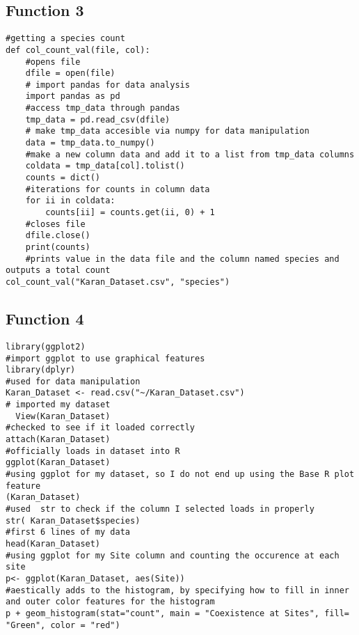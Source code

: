 \documentclass[letterpaper]{article}
\begin{document}
\subsection{Function 3 }
\begin{verbatim}
#getting a species count
def col_count_val(file, col):
    #opens file
    dfile = open(file)
    # import pandas for data analysis
    import pandas as pd
    #access tmp_data through pandas
    tmp_data = pd.read_csv(dfile)
    # make tmp_data accesible via numpy for data manipulation
    data = tmp_data.to_numpy()
    #make a new column data and add it to a list from tmp_data columns
    coldata = tmp_data[col].tolist()
    counts = dict()
    #iterations for counts in column data
    for ii in coldata:
        counts[ii] = counts.get(ii, 0) + 1
    #closes file
    dfile.close()
    print(counts)
    #prints value in the data file and the column named species and outputs a total count
col_count_val("Karan_Dataset.csv", "species")

\end{verbatim}

\subsection{Function 4}
\begin{verbatim}
library(ggplot2)
#import ggplot to use graphical features
library(dplyr)
#used for data manipulation
Karan_Dataset <- read.csv("~/Karan_Dataset.csv")
# imported my dataset
  View(Karan_Dataset)
#checked to see if it loaded correctly
attach(Karan_Dataset)
#officially loads in dataset into R
ggplot(Karan_Dataset)
#using ggplot for my dataset, so I do not end up using the Base R plot feature
(Karan_Dataset)
#used  str to check if the column I selected loads in properly
str( Karan_Dataset$species)
#first 6 lines of my data
head(Karan_Dataset)
#using ggplot for my Site column and counting the occurence at each site
p<- ggplot(Karan_Dataset, aes(Site))
#aestically adds to the histogram, by specifying how to fill in inner and outer color features for the histogram
p + geom_histogram(stat="count", main = "Coexistence at Sites", fill= "Green", color = "red")
\end{verbatim}
\end{document}
